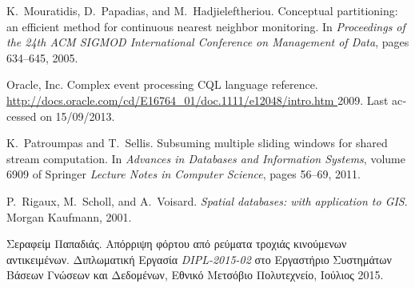 \begin{thebibliography}{1}
\bibitem{[MHP05]} {\textlatin{
K.~Mouratidis, D.~Papadias, and M.~Hadjieleftheriou. 
Conceptual partitioning: an efficient method for continuous nearest
  neighbor monitoring.
In {\em Proceedings of the 24th ACM SIGMOD International
  Conference on Management of Data}, pages 634--645, 2005}}.

\bibitem{[Ora11]} {\textlatin{
{Oracle, Inc}.
Complex event processing {CQL} language reference.
\url{http://docs.oracle.com/cd/E16764_01/doc.1111/e12048/intro.htm }
  2009. Last accessed on 15/09/2013}}.
  

\bibitem{[PS11]} {\textlatin{
K.~Patroumpas and T.~Sellis.
Subsuming multiple sliding windows for shared stream computation.
In {\em Advances in
  Databases and Information Systems}, volume 6909 of Springer {\em Lecture Notes in
  Computer Science}, pages 56--69, 2011}}.

\bibitem{[RSV02]} {\textlatin{
P.~Rigaux, M.~Scholl, and A.~Voisard.
{\em Spatial databases: with application to {GIS}}.
Morgan Kaufmann, 2001}}.

\bibitem{[Pap15]}
Σεραφείμ Παπαδιάς.
Απόρριψη φόρτου από ρεύματα
  τροχιάς κινούμενων αντικειμένων. Διπλωματική Εργασία {\textlatin{\em DIPL-2015-02}} στο
Εργαστήριο Συστημάτων Βάσεων Γνώσεων και Δεδομένων, Εθνικό Μετσόβιο
  Πολυτεχνείο, Ιούλιος 2015.

\end{thebibliography}